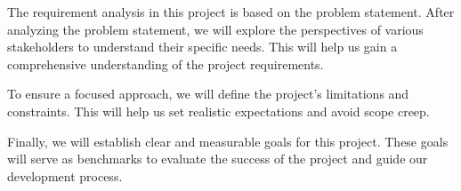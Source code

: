 The requirement analysis in this project is based on the problem statement.
After analyzing the problem statement, 
we will explore the perspectives of various stakeholders 
to understand their specific needs. 
This will help us gain a comprehensive understanding 
of the project requirements.

To ensure a focused approach, 
we will define the project's limitations and constraints. 
This will help us set realistic expectations and avoid scope creep.

Finally, we will establish clear and measurable goals for this project. 
These goals will serve as benchmarks 
to evaluate the success of the project 
and guide our development process.
